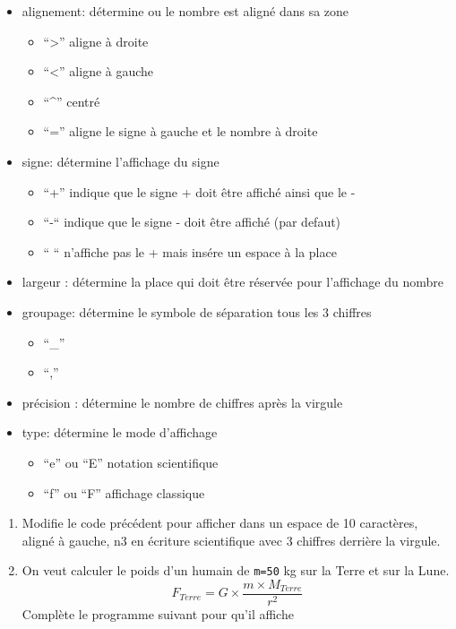 \documentclass[
]{book}
\providecommand{\tightlist}{%
  \setlength{\itemsep}{0pt}\setlength{\parskip}{0pt}}
\def\tightlist{}
\begin{document}
\begin{itemize}
\tightlist
\item
  alignement: détermine ou le nombre est aligné dans sa zone

  \begin{itemize}
  \tightlist
  \item
    ``\textgreater{}'' aligne à droite
  \item
    ``\textless{}'' aligne à gauche
  \item
    ``\^{}'' centré
  \item
    ``='' aligne le signe à gauche et le nombre à droite
  \end{itemize}
\item
  signe: détermine l'affichage du signe

  \begin{itemize}
  \tightlist
  \item
    ``+'' indique que le signe + doit être affiché ainsi que le -
  \item
    ``-`` indique que le signe - doit être affiché (par defaut)
  \item
    `` `` n'affiche pas le + mais insére un espace à la place
  \end{itemize}
\item
  largeur : détermine la place qui doit être réservée pour l'affichage du nombre
\item
  groupage: détermine le symbole de séparation tous les 3 chiffres

  \begin{itemize}
  \tightlist
  \item
    ``\_''
  \item
    ``,''
  \end{itemize}
\item
  précision : détermine le nombre de chiffres après la virgule
\item
  type: détermine le mode d'affichage

  \begin{itemize}
  \tightlist
  \item
    ``e'' ou ``E'' notation scientifique
  \item
    ``f'' ou ``F'' affichage classique
  \end{itemize}
\end{itemize}

\begin{enumerate}
\def\labelenumi{\arabic{enumi}.}
\setcounter{enumi}{2}
\item
  Modifie le code précédent pour afficher dans un espace de 10 caractères, aligné à gauche, n3 en écriture scientifique avec 3 chiffres derrière la virgule.
\item
  On veut calculer le poids d'un humain de \texttt{m=50} kg sur la Terre et sur la Lune. \[F_{Terre}=G\times \frac{m\times M_{Terre}}{r^2}\] Complète le programme suivant pour qu'il affiche
\end{enumerate}
\end{document}
